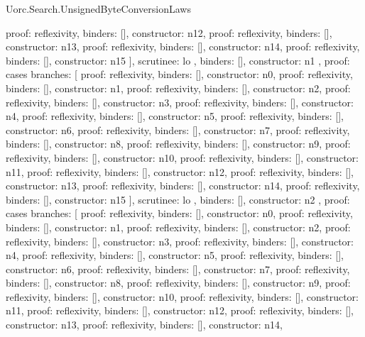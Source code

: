 \begin{lexlean}{Uorc.Search.UnsignedByteConversionLaws}
\begin{semanticmodule}
{{{{            {proof: reflexivity{}, binders: [], constructor: n12},
            {proof: reflexivity{}, binders: [], constructor: n13},
            {proof: reflexivity{}, binders: [], constructor: n14},
            {proof: reflexivity{}, binders: [], constructor: n15}
          ],
          scrutinee: lo
        },
        binders: [],
        constructor: n1
      },
      {
        proof: cases{
          branches: [
            {proof: reflexivity{}, binders: [], constructor: n0},
            {proof: reflexivity{}, binders: [], constructor: n1},
            {proof: reflexivity{}, binders: [], constructor: n2},
            {proof: reflexivity{}, binders: [], constructor: n3},
            {proof: reflexivity{}, binders: [], constructor: n4},
            {proof: reflexivity{}, binders: [], constructor: n5},
            {proof: reflexivity{}, binders: [], constructor: n6},
            {proof: reflexivity{}, binders: [], constructor: n7},
            {proof: reflexivity{}, binders: [], constructor: n8},
            {proof: reflexivity{}, binders: [], constructor: n9},
            {proof: reflexivity{}, binders: [], constructor: n10},
            {proof: reflexivity{}, binders: [], constructor: n11},
            {proof: reflexivity{}, binders: [], constructor: n12},
            {proof: reflexivity{}, binders: [], constructor: n13},
            {proof: reflexivity{}, binders: [], constructor: n14},
            {proof: reflexivity{}, binders: [], constructor: n15}
          ],
          scrutinee: lo
        },
        binders: [],
        constructor: n2
      },
      {
        proof: cases{
          branches: [
            {proof: reflexivity{}, binders: [], constructor: n0},
            {proof: reflexivity{}, binders: [], constructor: n1},
            {proof: reflexivity{}, binders: [], constructor: n2},
            {proof: reflexivity{}, binders: [], constructor: n3},
            {proof: reflexivity{}, binders: [], constructor: n4},
            {proof: reflexivity{}, binders: [], constructor: n5},
            {proof: reflexivity{}, binders: [], constructor: n6},
            {proof: reflexivity{}, binders: [], constructor: n7},
            {proof: reflexivity{}, binders: [], constructor: n8},
            {proof: reflexivity{}, binders: [], constructor: n9},
            {proof: reflexivity{}, binders: [], constructor: n10},
            {proof: reflexivity{}, binders: [], constructor: n11},
            {proof: reflexivity{}, binders: [], constructor: n12},
            {proof: reflexivity{}, binders: [], constructor: n13},
            {proof: reflexivity{}, binders: [], constructor: n14},
}}}}
\end{semanticmodule}
\end{lexlean}
